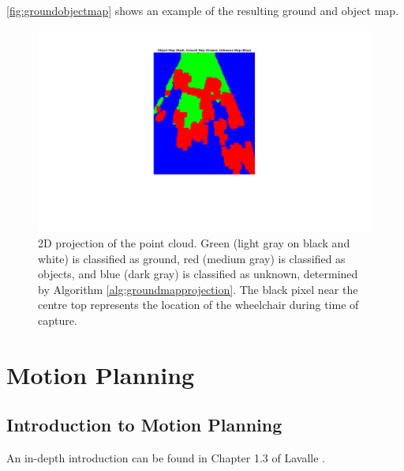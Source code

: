 \autoref{fig:groundobjectmap} shows an example of the resulting ground and
object map.

\begin{figure}
\centering
\includegraphics[width=5in]{figures/groundobjectmap.png}
\caption{2D projection of the point cloud. Green (light gray on black and white)
is classified as ground, red (medium gray) is classified as objects, and blue
(dark gray) is classified as unknown, determined by Algorithm
\autoref{alg:groundmapprojection}. The black pixel near the centre top
represents the location of the wheelchair during time of capture.}
\label{fig:groundobjectmap}
\end{figure}

\section{Motion Planning}

\subsection{Introduction to Motion Planning}
An in-depth introduction can be found in Chapter 1.3 of Lavalle
\cite{lavalle2006planning}.

